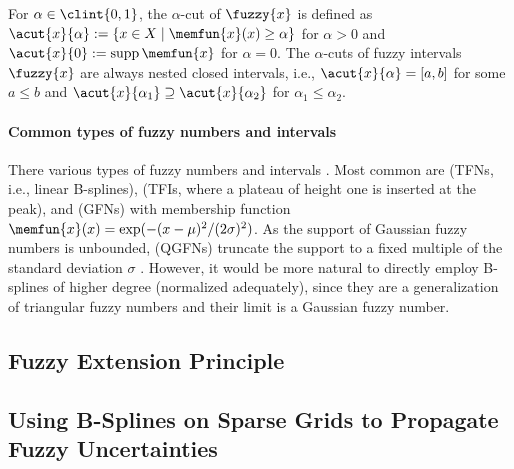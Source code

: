 For $\alpha \in \clint{0, 1}$, the $\alpha$-cut of $\fuzzy{x}$ is
defined as $\acut{x}{\alpha} := \{x \in X \mid \memfun{x}(x) \ge \alpha\}$
for $\alpha > 0$ and $\acut{x}{0} := \supp \memfun{x}$ for $\alpha = 0$.
The $\alpha$-cuts of fuzzy intervals $\fuzzy{x}$ are always
nested closed intervals, i.e.,
$\acut{x}{\alpha} = [a, b]$ for some $a \le b$ and
$\acut{x}{\alpha_1} \supset \acut{x}{\alpha_2}$ for $\alpha_1 \le \alpha_2$.

\paragraph{Common types of fuzzy numbers and intervals}

There various types of fuzzy numbers and intervals \cite{Klimke06Uncertainty}.
Most common are
 (TFNs, i.e., linear B-splines),
(TFIs, where a plateau of height one is inserted at the peak), and
 (GFNs) with membership function
$\memfun{x}(x) = \exp(-(x - \mu)^2/(2\sigma)^2)$.
As the support of Gaussian fuzzy numbers is unbounded,
 (QGFNs) truncate the support
to a fixed multiple of the standard deviation $\sigma$
\cite{Klimke06Uncertainty}.
However, it would be more natural to directly employ B-splines of
higher degree (normalized adequately), since they are a generalization
of triangular fuzzy numbers and their limit is a Gaussian fuzzy number.



\subsection{Fuzzy Extension Principle}
\label{sec:542fuzzyExtensionPrinciple}

\blindtext{}



\subsection{Using B-Splines on Sparse Grids to Propagate Fuzzy Uncertainties}
\label{sec:543fuzzyBSplines}

\blindtext{}
